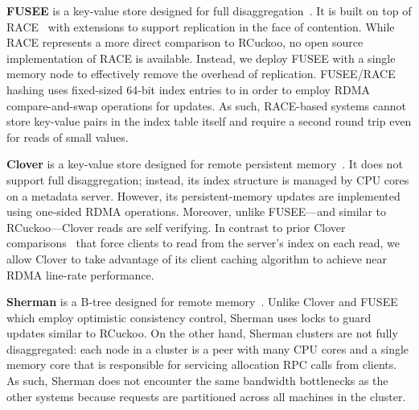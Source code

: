 \textbf{FUSEE}
is a key-value store designed for full
disaggregation~\cite{fusee}.  It is built on top of RACE~\cite{race}
with extensions to support replication in the face of contention.
While RACE represents a more direct comparison to RCuckoo, no open
source implementation of RACE is available.  Instead, we deploy FUSEE
with a single memory node to effectively remove the overhead of
replication.  FUSEE/RACE hashing uses fixed-sized 64-bit index entries
to in order to employ RDMA compare-and-swap operations for updates. As
such, RACE-based systems cannot store key-value pairs in the index
table itself and require a second round trip even for reads of small values.

\textbf{Clover}
is a key-value store designed for remote persistent memory~\cite{clover}. It
does not support full disaggregation; instead, its index structure is
managed by CPU cores on a metadata server. However, its
persistent-memory updates are implemented using one-sided RDMA
operations.  Moreover, unlike FUSEE---and similar to RCuckoo---Clover
reads are self verifying.
In contrast to prior Clover comparisons~\cite{fusee} that force
clients to read from the server's index on each read, we allow Clover
to take advantage of its client caching algorithm to achieve near
RDMA line-rate performance.

\textbf{Sherman}
is a B-tree designed for remote memory~\cite{sherman}.
Unlike Clover and FUSEE which employ optimistic consistency control,
Sherman uses locks to guard updates similar to RCuckoo.  On the other
hand, Sherman clusters are not fully disaggregated: each node in a
cluster is a peer with many CPU cores and a single memory core
that is responsible for servicing allocation RPC calls from clients.
As such, Sherman does not encounter the same bandwidth bottlenecks as
the other systems because requests are partitioned across all
machines in the cluster.


